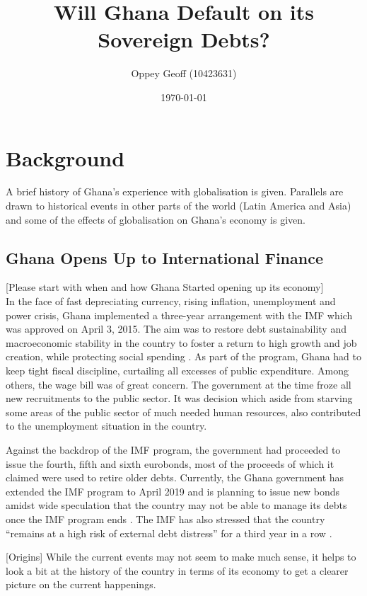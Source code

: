 \documentclass[a4paper, 12pt]{article}
\author{Oppey Geoff (10423631)}
\title{Will Ghana Default on its Sovereign Debts?}
\date{\today}
\begin{document}
	\maketitle
	\clearpage
	\tableofcontents
	\newpage
	\listoffigures
	\newpage
	\doublespacing

	\section{Background}
	A brief history of Ghana's experience with globalisation is given. Parallels are drawn to historical events in other parts of the world (Latin America and Asia) and some of the effects of globalisation on Ghana's economy is given.
	
	\subsection{Ghana Opens Up to International Finance}
	[Please start with when and how Ghana Started opening up its economy]\\
	In the face of fast depreciating currency, rising inflation, unemployment and power crisis, Ghana implemented a three-year arrangement with the IMF which was approved on April 3, 2015. The aim was to restore debt sustainability and macroeconomic stability in the country to foster a return to high growth and job creation, while protecting social spending \cite{IMF2018}. As part of the program, Ghana had to keep tight fiscal discipline, curtailing all excesses of public expenditure. Among others, the wage bill was of great concern. The government at the time froze all new recruitments to the public sector. It was decision which aside from starving some areas of the public sector of much needed human resources, also contributed to the unemployment situation in the country.
	
	Against the backdrop of the IMF program, the government had proceeded to issue the fourth, fifth and sixth eurobonds, most of the proceeds of which it claimed were used to retire older debts. Currently, the Ghana government has extended the IMF program to April 2019 and is planning to issue new bonds amidst wide speculation that the country may not be able to manage its debts once the IMF program ends \cite{Dontoh2019Jan}. The IMF has also stressed that the country ``remains at a high risk of external debt distress'' for a third year in a row \cite{DEBTSUSTAINAB}. 
	
	[Origins]
	While the current events may not seem  to make much sense, it helps to look a bit at the history of the country in terms of its economy to get a clearer picture on the current happenings.
	
\end{document}
